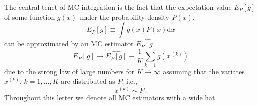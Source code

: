 \documentclass[aps,prd,reprint,nofootinbib,preprintnumbers]{revtex4}
\newcommand{\dd}{\text{d}}
\newcommand{\est}[1]{\widehat{#1}}
\begin{document}
The central tenet of MC integration is the fact that the expectation value $E_P[g]$ of some function
$g(x)$ under the probability density $P(x)$,
\begin{equation}
    E_P[g] \equiv \int g(x) P(x) \dd x
\end{equation}
can be approximated \cite{MCSM-2004} by an MC estimator $\est{E_P[g]}$
\begin{equation}
    \label{eq:mc-id}
    E_P[g] \to \widehat{E_P[g]} \equiv \frac{1}{K} \sum_{k=1} g(x^{(k)})
\end{equation}
due to the strong law of large numbers for $K \to \infty$ assuming
that the variates $x^{(k)}$, $k = 1, \dots, K$ are distributed as
$P$; i.e.,
\begin{equation}
    x^{(k)} \sim P\,.
\end{equation}
Throughout this letter we denote all MC estimators with a wide hat.\\
\end{document}
